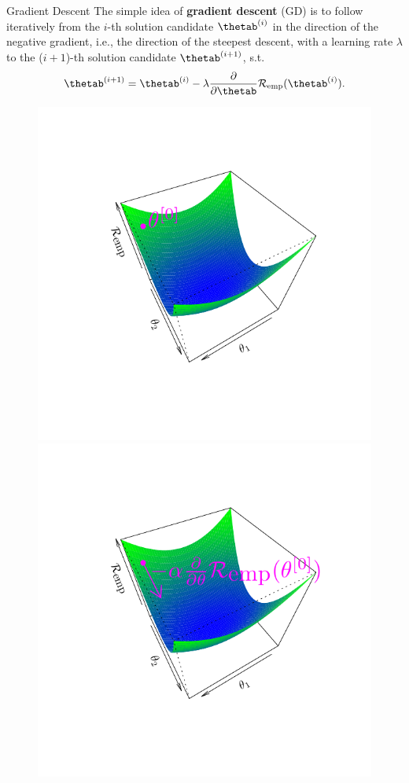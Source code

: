 \documentclass[11pt,compress,t,notes=noshow, xcolor=table]{beamer}
\begin{document}
\begin{vbframe}{Gradient Descent}
The simple idea of \textbf{gradient descent} (GD) is to follow iteratively from the $i$-th solution candidate $\thetab^{(i)}$ in the direction of the negative gradient, i.e., the direction of the steepest descent, with a learning rate $\lambda$ to the ($i+1$)-th solution candidate $\thetab^{(i+1)}$, s.t.
\[
\thetab^{(i+1)} = \thetab^{(i)} - \lambda \frac{\partial}{\partial\thetab}{\riske(\thetab^{(i)})}.
\]

\begin{figure}[!htb]
  \includegraphics[trim=2cm 2cm 2cm 2cm, width=\linewidth]{figure/grad_desc1}  
\endminipage\hfill
{}
  \includegraphics[trim=2cm 2cm 2cm 2cm, width=\linewidth]{figure/grad_desc2}

\end{figure}
\end{vbframe}
\end{document}
